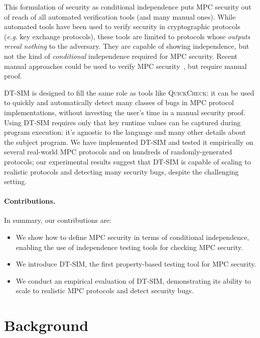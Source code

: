 \documentclass[acmlarge, manuscript, screen, review, anonymous, table]{acmart}
\newcommand{\eg}{\textit{e.g.}\xspace}
\newcommand{\toolname}{\textsc{DT-SIM}\xspace}
\begin{document}
This formulation of security as conditional independence puts MPC security out of reach of all automated verification tools (and many manual ones). While automated tools have been used to verify security in cryptographic protocols~\cite{gancher2023owl, barthe2019probabilistic, darais2019language, fournet2011information}  (\eg key exchange protocols), these tools are limited to protocols whose \emph{outputs reveal nothing} to the adversary. They are capable of showing independence, but not the kind of \emph{conditional} independence required for MPC security. Recent manual approaches could be used to verify MPC security~\cite{li2023lilac, gancher2023core, haagh2018computer}, but require manual proof.

\toolname is designed to fill the same role as tools like \textsc{QuickCheck}: it can be used to quickly and automatically detect many classes of bugs in MPC protocol implementations, without investing the user's time in a manual security proof.
Using \toolname requires only that key runtime values can be captured during program execution;
it's agnostic to the language and many other details about the subject program.
We have implemented \toolname and tested it empirically on several real-world MPC protocols and on hundreds of randomly-generated protocols; our experimental results suggest that \toolname is capable of scaling to realistic protocols and detecting many security bugs, despite the challenging setting.


\paragraph{Contributions.}
In summary, our contributions are:
%
\begin{itemize}
\item We show how to define MPC security in terms of conditional independence, enabling the use of independence testing tools for checking MPC security.
\item We introduce \toolname, the first property-based testing tool for MPC security.
\item We conduct an empirical evaluation of \toolname, demonstrating its ability to scale to realistic MPC protocols and detect security bugs.
\end{itemize}



\section{Background}
\end{document}
